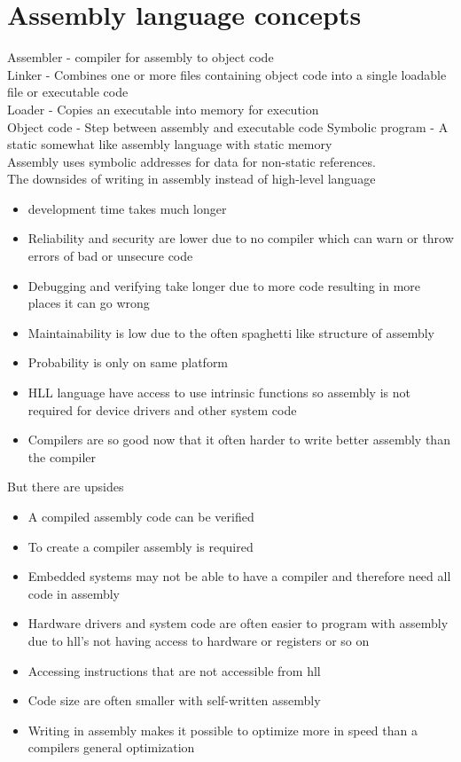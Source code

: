 \documentclass[12pt, a4paper]{article}
\begin{document}
	\section{Assembly language concepts}
		Assembler - compiler for assembly to object code\\
		Linker - Combines one or more files containing object code into a single loadable file or executable code\\
		Loader - Copies an executable into memory for execution\\
		Object code - Step between assembly and executable code
		Symbolic program - A static somewhat like assembly language with static memory\\
		Assembly uses symbolic addresses for data for non-static references.\\
		The downsides of writing in assembly instead of high-level language
		\begin{itemize}
			\item development time takes much longer
			\item Reliability and security are lower due to no compiler which can warn or throw errors of bad or unsecure code
			\item Debugging and verifying take longer due to more code resulting in more places it can go wrong
			\item Maintainability is low due to the often spaghetti like structure of assembly
			\item Probability is only on same platform
			\item HLL language have access to use intrinsic functions so assembly is not required for device drivers and other system code
			\item Compilers are so good now that it often harder to write better assembly than the compiler
		\end{itemize}
		But there are upsides
		\begin{itemize}
			\item A compiled assembly code can be verified
			\item To create a compiler assembly is required
			\item Embedded systems may not be able to have a compiler and therefore need all code in assembly
			\item Hardware drivers and system code are often easier to program with assembly due to hll's not having access to hardware or registers or so on
			\item Accessing instructions that are not accessible from hll
			\item Code size are often smaller with self-written assembly
			\item Writing in assembly makes it possible to optimize more in speed than a compilers general optimization
		\end{itemize}
\end{document}
